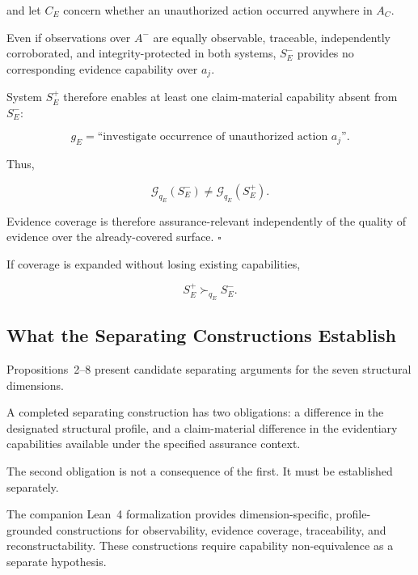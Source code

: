and let \(C_E\) concern whether an unauthorized action occurred anywhere in \(A_C\).

Even if observations over \(A^{-}\) are equally observable, traceable, independently corroborated, and integrity-protected in both systems, \(S_E^{-}\) provides no corresponding evidence capability over \(a_j\).

System \(S_E^{+}\) therefore enables at least one claim-material capability absent from \(S_E^{-}\):

\begin{equation}
  g_E
  =
  \text{``investigate occurrence of unauthorized action }a_j\text{''}.
\end{equation}

Thus,

\begin{equation}
  \mathcal{G}_{q_E}(S_E^{-})
  \neq
  \mathcal{G}_{q_E}(S_E^{+}).
\end{equation}

Evidence coverage is therefore assurance-relevant independently of the quality of evidence over the already-covered surface.
\hfill\(\square\)

If coverage is expanded without losing existing capabilities,

\begin{equation}
  S_E^{+}
  \succ_{q_E}
  S_E^{-}.
\end{equation}

\subsection{What the Separating Constructions Establish}
\label{aa.subsec.what-separation-establishes}

Propositions~2--8 present candidate separating arguments for the
seven structural dimensions.

A completed separating construction has two obligations:
a difference in the designated structural profile, and a
claim-material difference in the evidentiary capabilities
available under the specified assurance context.

The second obligation is not a consequence of the first.
It must be established separately.

The companion Lean~4 formalization
provides dimension-specific, profile-grounded constructions for
observability, evidence coverage, traceability, and reconstructability.
These constructions require capability non-equivalence as a
separate hypothesis.

